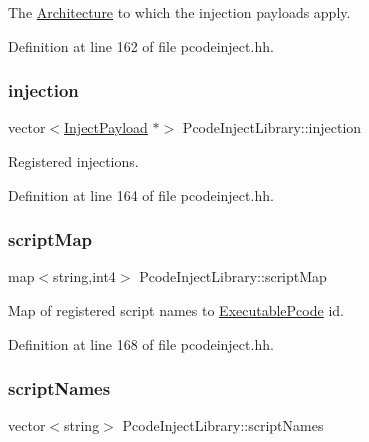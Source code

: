 The \mbox{\hyperlink{class_architecture}{Architecture}} to which the injection payloads apply. 



Definition at line 162 of file pcodeinject.\+hh.

\mbox{\label{class_pcode_inject_library_ab56d641b00776993e15d0349627a8672}} 
\subsubsection{\texorpdfstring{injection}{injection}}
{\footnotesize\ttfamily vector$<$\mbox{\hyperlink{class_inject_payload}{Inject\+Payload}} $\ast$$>$ Pcode\+Inject\+Library\+::injection\hspace{0.3cm}{\ttfamily [protected]}}



Registered injections. 



Definition at line 164 of file pcodeinject.\+hh.

\mbox{\label{class_pcode_inject_library_a6c35289813560d4552f2464e1a804bc2}} 
\subsubsection{\texorpdfstring{scriptMap}{scriptMap}}
{\footnotesize\ttfamily map$<$string,int4$>$ Pcode\+Inject\+Library\+::script\+Map\hspace{0.3cm}{\ttfamily [protected]}}



Map of registered script names to \mbox{\hyperlink{class_executable_pcode}{Executable\+Pcode}} id. 



Definition at line 168 of file pcodeinject.\+hh.

\mbox{\label{class_pcode_inject_library_ac78d668f99a551401c0a88ad6ea52a45}} 
\subsubsection{\texorpdfstring{scriptNames}{scriptNames}}
{\footnotesize\ttfamily vector$<$string$>$ Pcode\+Inject\+Library\+::script\+Names\hspace{0.3cm}{\ttfamily [protected]}}



